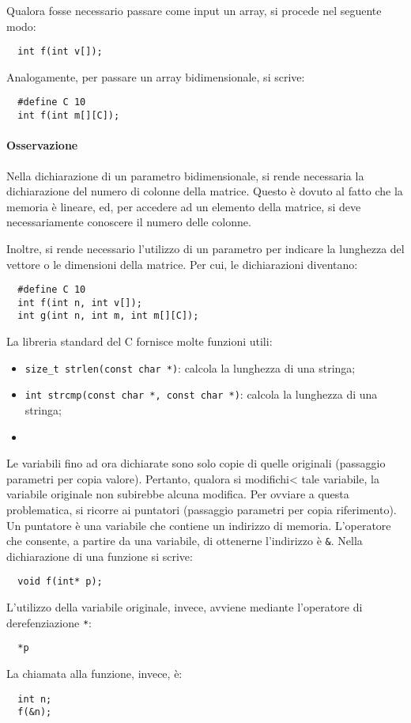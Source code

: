Qualora fosse necessario passare come input un array, si procede nel seguente modo:
\begin{verbatim}
  int f(int v[]);
\end{verbatim}
Analogamente, per passare un array bidimensionale, si scrive:
\begin{verbatim}
  #define C 10
  int f(int m[][C]);
\end{verbatim}
\paragraph*{Osservazione}
Nella dichiarazione di un parametro bidimensionale, si rende necessaria la dichiarazione del numero di colonne della matrice. Questo è dovuto al fatto che la memoria è lineare, ed, per accedere ad un elemento della matrice, si deve necessariamente conoscere il numero delle colonne.

Inoltre, si rende necessario l'utilizzo di un parametro per indicare la lunghezza del vettore o le dimensioni della matrice. Per cui, le dichiarazioni diventano:
\begin{verbatim}
  #define C 10
  int f(int n, int v[]);
  int g(int n, int m, int m[][C]);
\end{verbatim}

La libreria standard del C fornisce molte funzioni utili:
\begin{itemize}
  \item \verb|size_t strlen(const char *)|: calcola la lunghezza di una stringa;
  \item \verb|int strcmp(const char *, const char *)|: calcola la lunghezza di una stringa;
  \item 
\end{itemize}

Le variabili fino ad ora dichiarate sono solo copie di quelle originali (passaggio parametri per copia valore). Pertanto, qualora si modifichi< tale variabile, la variabile originale non subirebbe alcuna modifica. Per ovviare a questa problematica, si ricorre ai puntatori (passaggio parametri per copia riferimento). Un puntatore è una variabile che contiene un indirizzo di memoria. L'operatore che consente, a partire da una variabile, di ottenerne l'indirizzo è \verb|&|. Nella dichiarazione di una funzione si scrive:
\begin{verbatim}
  void f(int* p);
\end{verbatim}
L'utilizzo della variabile originale, invece, avviene mediante l'operatore di derefenziazione \verb|*|:
\begin{verbatim}
  *p
\end{verbatim}
La chiamata alla funzione, invece, è:
\begin{verbatim}
  int n;
  f(&n);
\end{verbatim}
